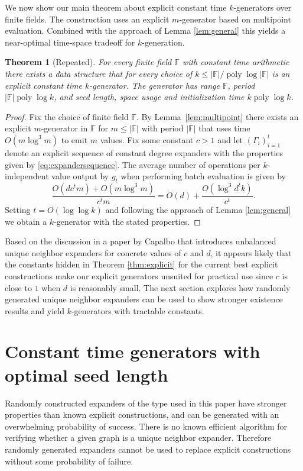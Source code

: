 \documentclass[a4paper,11pt]{article}
\theoremstyle{plain}
\newtheorem{restate}{Theorem}
\theoremstyle{definition}
\newcommand{\F}{\mathbb{F}}
\DeclareMathOperator{\poly}{poly}
\begin{document}
We now show our main theorem about explicit constant time $k$-generators over finite fields. 
The construction uses an explicit $m$-generator based on multipoint evaluation. 
Combined with the approach of Lemma \ref{lem:general} this yields a near-optimal time-space tradeoff for $k$-generation.
\begin{restate}[Repeated]
For every finite field $\F$ with constant time arithmetic there exists a data structure that for every choice of $k \leq |\F| /\! \poly \log |\F|$ is an explicit constant time $k$-generator.
The generator has range $\F$, period $|\F|\poly \log k$, and seed length, space usage and initialization time $k \poly \log k$.
\end{restate}
\begin{proof}
Fix the choice of finite field $\F$. 
By Lemma~\ref{lem:multipoint} there exists an explicit $m$-generator in $\F$ for $m \leq |\F|$ with period $|\F|$ that uses time $O(m \log^{3} m)$ to emit $m$ values.
Fix some constant $c > 1$ and let $\left(\Gamma_{i}\right)^{t}_{i = 1}$ denote an explicit sequence of constant degree expanders with the properties given by \eqref{eq:expandersequence}.
The average number of operations per $k$-independent value output by $g_{t}$ when performing batch evaluation is given by
\begin{equation}
\frac{O(dc^{t}m) + O(m \log^{3} m)}{c^{t}m} = O(d) + \frac{O(\log^{3} d^{t}k)}{c^{t}}. \label{eq:averagetimefield}
\end{equation}
Setting $t = O(\log \log k)$ and following the approach of Lemma \ref{lem:general} we obtain a $k$-generator with the stated properties. 
\end{proof}
Based on the discussion in a paper by Capalbo \cite{capalbo2005} that introduces unbalanced unique neighbor expanders for concrete values of $c$ and $d$, it appears likely that the constants hidden in Theorem \ref{thm:explicit} for the current best explicit constructions make our explicit generators unsuited for practical use since $c$ is close to $1$ when $d$ is reasonably small. 
The next section explores how randomly generated unique neighbor expanders can be used to show stronger existence results and yield $k$-generators with tractable constants.  
\section{Constant time generators with optimal seed length} \label{sec:probabilistic}
Randomly constructed expanders of the type used in this paper have stronger properties than known explicit constructions, and can be generated with an overwhelming probability of success.
There is no known efficient algorithm for verifying whether a given graph is a unique neighbor expander.
Therefore randomly generated expanders cannot be used to replace explicit constructions without some probability of failure.
\end{document}
